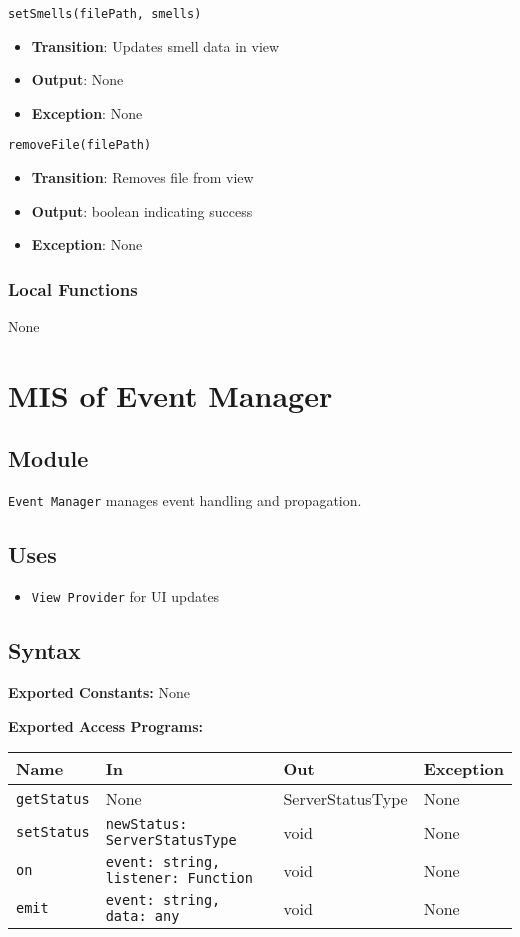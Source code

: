 \documentclass[12pt, titlepage]{article}
\begin{document}
\texttt{setSmells(filePath, smells)}
\begin{itemize}
\item \textbf{Transition}: Updates smell data in view
\item \textbf{Output}: None
\item \textbf{Exception}: None
\end{itemize}

\texttt{removeFile(filePath)}
\begin{itemize}
\item \textbf{Transition}: Removes file from view
\item \textbf{Output}: boolean indicating success
\item \textbf{Exception}: None
\end{itemize}

\subsubsection{Local Functions}
None

\section{MIS of Event Manager}

\subsection{Module}
\texttt{Event Manager} manages event handling and propagation.

\subsection{Uses}
\begin{itemize}
\item \texttt{View Provider} for UI updates
\end{itemize}

\subsection{Syntax}

\textbf{Exported Constants:} None

\textbf{Exported Access Programs:}\\
\begin{tabularx}{\linewidth}{|l|>{\raggedright\arraybackslash}X|l|l|}
  \hline
  \textbf{Name} & \textbf{In} & \textbf{Out} & \textbf{Exception} \\
  \hline
  \texttt{getStatus} & None & ServerStatusType & None \\ \hline
  \texttt{setStatus} & \texttt{newStatus: ServerStatusType} & void & None \\ \hline
  \texttt{on} & \texttt{event: string, listener: Function} & void & None \\ \hline
  \texttt{emit} & \texttt{event: string, data: any} & void & None \\
  \hline
\end{tabularx}
\end{document}
